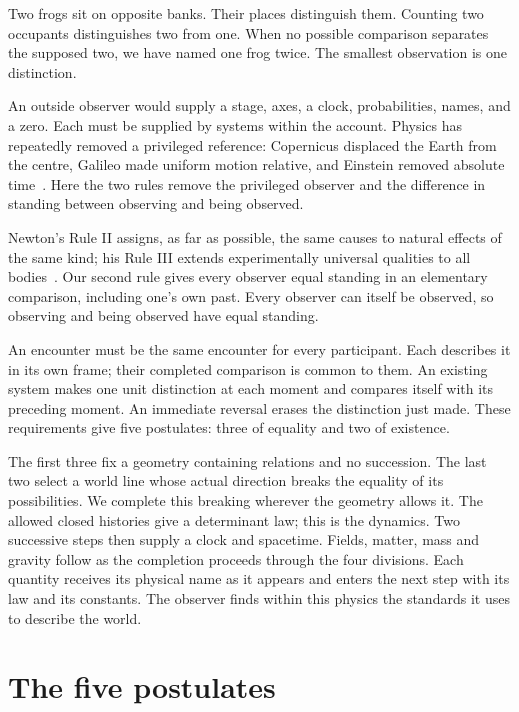 \documentclass[aps,prx,reprint,longbibliography]{revtex4-2}
\begin{document}
Two frogs sit on opposite banks. Their places distinguish them. Counting two occupants distinguishes two from one. When no possible comparison separates the supposed two, we have named one frog twice. The smallest observation is one distinction.

An outside observer would supply a stage, axes, a clock, probabilities, names, and a zero. Each must be supplied by systems within the account. Physics has repeatedly removed a privileged reference: Copernicus displaced the Earth from the centre, Galileo made uniform motion relative, and Einstein removed absolute time~\cite{Copernicus,Galileo,Einstein1905}. Here the two rules remove the privileged observer and the difference in standing between observing and being observed.

Newton's Rule II assigns, as far as possible, the same causes to natural effects of the same kind; his Rule III extends experimentally universal qualities to all bodies~\cite{Newton}. Our second rule gives every observer equal standing in an elementary comparison, including one's own past. Every observer can itself be observed, so observing and being observed have equal standing.

An encounter must be the same encounter for every participant. Each describes it in its own frame; their completed comparison is common to them. An existing system makes one unit distinction at each moment and compares itself with its preceding moment. An immediate reversal erases the distinction just made. These requirements give five postulates: three of equality and two of existence.

The first three fix a geometry containing relations and no succession. The last two select a world line whose actual direction breaks the equality of its possibilities. We complete this breaking wherever the geometry allows it. The allowed closed histories give a determinant law; this is the dynamics. Two successive steps then supply a clock and spacetime. Fields, matter, mass and gravity follow as the completion proceeds through the four divisions. Each quantity receives its physical name as it appears and enters the next step with its law and its constants. The observer finds within this physics the standards it uses to describe the world.

\section{The five postulates}
\label{sec:postulates}
\end{document}
